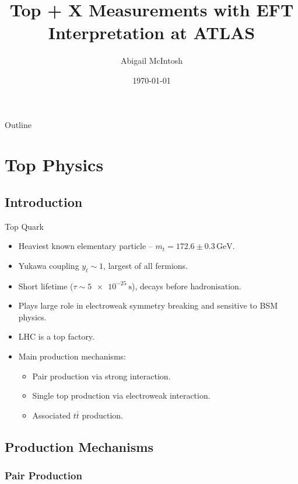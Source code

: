 \documentclass{beamer}
\title{Top + X Measurements with EFT Interpretation at ATLAS}
\author{Abigail McIntosh}
\institute{University of Sussex}
\date{\today}
\begin{document}
\begin{frame}
  \titlepage
\end{frame}

\begin{frame}{Outline}
  \tableofcontents
\end{frame}

\section{Top Physics}
\subsection{Introduction}

\begin{frame}{Top Quark}
  \begin{itemize}
    \item Heaviest known elementary particle -- $m_t = 172.6 \pm 0.3\,\unit{\giga\electronvolt}$.
    \item Yukawa coupling $y_t \sim 1$, largest of all fermions.
    \item Short lifetime ($\tau \sim \qty{5e-25}{\second}$), decays before hadronisation.
    \item Plays large role in electroweak symmetry breaking and sensitive to BSM physics.
    \item LHC is a top factory.
    \item Main production mechanisms:
    \begin{itemize}
      \item Pair production via strong interaction.
      \item Single top production via electroweak interaction.
      \item Associated $t\bar{t}$ production.
    \end{itemize}
  \end{itemize}
\end{frame}

\subsection{Production Mechanisms}
\subsubsection{Pair Production}
\end{document}
